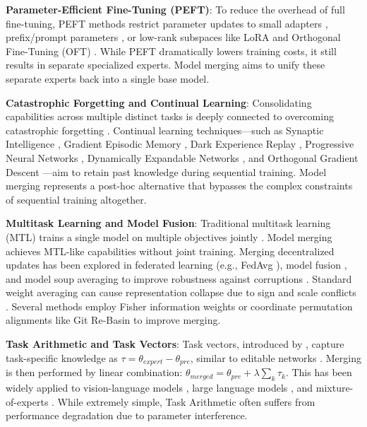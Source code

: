 \documentclass{article}
\theoremstyle{plain}
\theoremstyle{definition}
\theoremstyle{remark}
\begin{document}
\textbf{Parameter-Efficient Fine-Tuning (PEFT)}: To reduce the overhead of full fine-tuning, PEFT methods restrict parameter updates to small adapters \cite{Houlsby2019, Pfeiffer2020, Guo2020}, prefix/prompt parameters \cite{Lester2021, Li2021}, or low-rank subspaces like LoRA \cite{Hu2022} and Orthogonal Fine-Tuning (OFT) \cite{Qiu2023}. While PEFT dramatically lowers training costs, it still results in separate specialized experts. Model merging aims to unify these separate experts back into a single base model.

\textbf{Catastrophic Forgetting and Continual Learning}: Consolidating capabilities across multiple distinct tasks is deeply connected to overcoming catastrophic forgetting \cite{Kirkpatrick2017}. Continual learning techniques—such as Synaptic Intelligence \cite{Zenke2017}, Gradient Episodic Memory \cite{LopezPaz2017}, Dark Experience Replay \cite{Buzzega2020}, Progressive Neural Networks \cite{Rusu2016}, Dynamically Expandable Networks \cite{Yoon2017}, and Orthogonal Gradient Descent \cite{Farajtabar2020}—aim to retain past knowledge during sequential training. Model merging represents a post-hoc alternative that bypasses the complex constraints of sequential training altogether.

\textbf{Multitask Learning and Model Fusion}: Traditional multitask learning (MTL) trains a single model on multiple objectives jointly \cite{Caruana1997, Zhu2023}. Model merging achieves MTL-like capabilities without joint training. Merging decentralized updates has been explored in federated learning (e.g., FedAvg \cite{McMahan2017}), model fusion \cite{Choshen2022}, and model soup averaging \cite{Wortsman2022} to improve robustness against corruptions \cite{Hendrycks2019}. Standard weight averaging can cause representation collapse due to sign and scale conflicts \cite{Yadav2023}. Several methods employ Fisher information weights \cite{Matena2021} or coordinate permutation alignments like Git Re-Basin \cite{Ainsworth2023} to improve merging.

\textbf{Task Arithmetic and Task Vectors}: Task vectors, introduced by \cite{Ilharco2022}, capture task-specific knowledge as $\tau = \theta_{expert} - \theta_{pre}$, similar to editable networks \cite{Sinitsin2020}. Merging is then performed by linear combination: $\theta_{merged} = \theta_{pre} + \lambda \sum_k \tau_k$. This has been widely applied to vision-language models \cite{Mitchell2022}, large language models \cite{Chowdhery2023}, and mixture-of-experts \cite{Qiu2024}. While extremely simple, Task Arithmetic often suffers from performance degradation due to parameter interference.
\end{document}
